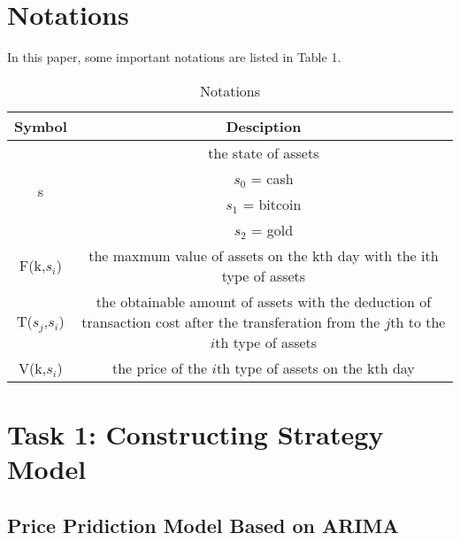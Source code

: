 \documentclass{mcmthesis}
\begin{document}
\section{Notations}
\par In this paper, some important notations are listed in Table 1.
\begin{longtable}{c c}
\caption{Notations}\label{Table 1}\\
\hline
Symbol             & \multicolumn{1}{c}{Desciption}                                                                                                        \\ \hline
\multirow{4}{*}{s} & the state of assets                                                                                                                   \\
                   & $s_0$ = cash                                                                                                                           \\
                    & $s_1$ = bitcoin                                                                                                                        \\
                    & $s_2$ = gold                                                                                                                           \\
F(k,$s_i$)          & the maxmum value of assets on the kth day with the ith type of assets                                                                 \\
T($s_j$,$s_i$)          & \makecell[l]{the obtainable amount of assets with the deduction of transaction cost \\ after the transferation from the $j$th to the $i$th type of assets} \\
V(k,$s_i$)          & the price of the $i$th type of assets on the kth day                                                                                    \\ \hline
\end{longtable}

\section{Task 1: Constructing Strategy Model}

\subsection{Price Pridiction Model Based on ARIMA}
\end{document}

